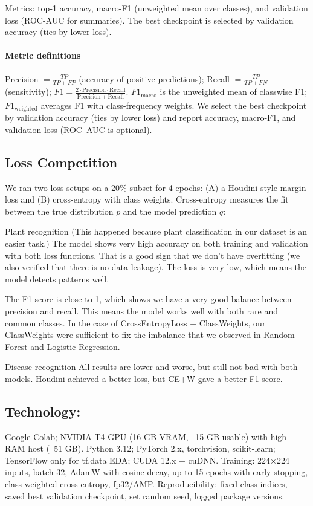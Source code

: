 \documentclass{article}
\begin{document}
Metrics: top-1 accuracy, macro-F1 (unweighted mean over classes), and validation loss (ROC-AUC for summaries). The best checkpoint is selected by validation accuracy (ties by lower loss).


\paragraph{Metric definitions}
Precision $=\tfrac{TP}{TP+FP}$ (accuracy of positive predictions);
Recall $=\tfrac{TP}{TP+FN}$ (sensitivity); 
$F1=\tfrac{2\cdot \mathrm{Precision}\cdot \mathrm{Recall}}{\mathrm{Precision}+\mathrm{Recall}}$.
$F1_{\text{macro}}$ is the unweighted mean of classwise F1; $F1_{\text{weighted}}$ averages F1 with class-frequency weights.
We select the best checkpoint by validation accuracy (ties by lower loss) and report accuracy, macro-F1, and validation loss (ROC–AUC is optional).

\subsection{Loss Competition}
We ran two loss setups on a 20\% subset for 4 epochs: (A) a Houdini-style margin loss and (B) cross-entropy with class weights. Cross-entropy measures the fit between the true distribution $p$ and the model prediction $q$:

Plant recognition
(This happened because plant classification in our dataset is an easier task.)
The model shows very high accuracy on both training and validation with both loss functions. That is a good sign that we don’t have overfitting (we also verified that there is no data leakage). The loss is very low, which means the model detects patterns well.

The F1 score is close to 1, which shows we have a very good balance between precision and recall. This means the model works well with both rare and common classes. In the case of CrossEntropyLoss + ClassWeights, our ClassWeights were sufficient to fix the imbalance 
that we observed in Random Forest and Logistic Regression.

Disease recognition
All results are lower and worse, but still not bad with both models. Houdini achieved a better loss, but CE+W gave a better F1 score.



\subsection{Technology:}
Google Colab; NVIDIA T4 GPU (16 GB VRAM, ~15 GB usable) with high-RAM host (~51 GB). Python 3.12; PyTorch 2.x, torchvision, scikit-learn; TensorFlow only for tf.data EDA; CUDA 12.x + cuDNN. Training: 224×224 inputs, batch 32, AdamW with cosine decay, up to 15 epochs with early stopping, class-weighted cross-entropy, fp32/AMP. Reproducibility: fixed class indices, saved best validation checkpoint, set random seed, logged package versions.
\end{document}
